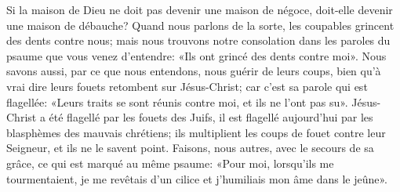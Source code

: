 Si la maison de Dieu ne doit pas devenir une maison de négoce,
	doit-elle devenir une maison de débauche?
Quand nous parlons de la sorte, les coupables grincent des dents contre nous;
	mais nous trouvons notre consolation
		dans les paroles du psaume que vous venez d’entendre:
	«Ils ont grincé des dents contre moi».
Nous savons aussi, par ce que nous entendons, nous guérir de leurs coups,
	bien qu’à vrai dire leurs fouets retombent sur Jésus-Christ;
	car c’est sa parole qui est flagellée:
	«Leurs traits se sont réunis contre moi, et ils ne l’ont pas su».
Jésus-Christ a été flagellé par les fouets des Juifs,
	il est flagellé aujourd’hui par les blasphèmes des mauvais chrétiens;
	ils multiplient les coups de fouet contre leur Seigneur,
	et ils ne le savent point.
Faisons, nous autres, avec le secours de sa grâce,
	ce qui est marqué au même psaume:
	«Pour moi, lorsqu’ils me tourmentaient,
	je me revêtais d’un cilice et j’humiliais mon âme dans le jeûne».
